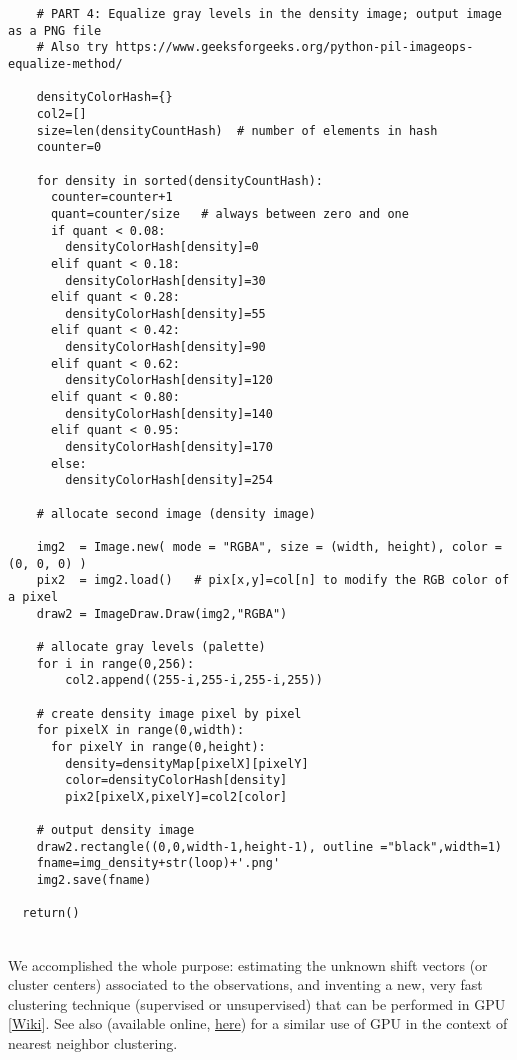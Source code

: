 \documentclass[10pt]{article}
\begin{document}
\begin{lstlisting}
    # PART 4: Equalize gray levels in the density image; output image as a PNG file
    # Also try https://www.geeksforgeeks.org/python-pil-imageops-equalize-method/

    densityColorHash={}
    col2=[]
    size=len(densityCountHash)  # number of elements in hash
    counter=0

    for density in sorted(densityCountHash):
      counter=counter+1
      quant=counter/size   # always between zero and one
      if quant < 0.08:
        densityColorHash[density]=0
      elif quant < 0.18:
        densityColorHash[density]=30
      elif quant < 0.28:
        densityColorHash[density]=55
      elif quant < 0.42:
        densityColorHash[density]=90
      elif quant < 0.62:
        densityColorHash[density]=120
      elif quant < 0.80:
        densityColorHash[density]=140
      elif quant < 0.95:
        densityColorHash[density]=170
      else:
        densityColorHash[density]=254

    # allocate second image (density image)

    img2  = Image.new( mode = "RGBA", size = (width, height), color = (0, 0, 0) )
    pix2  = img2.load()   # pix[x,y]=col[n] to modify the RGB color of a pixel
    draw2 = ImageDraw.Draw(img2,"RGBA")

    # allocate gray levels (palette)
    for i in range(0,256):
        col2.append((255-i,255-i,255-i,255))

    # create density image pixel by pixel
    for pixelX in range(0,width):
      for pixelY in range(0,height):
        density=densityMap[pixelX][pixelY]
        color=densityColorHash[density]
        pix2[pixelX,pixelY]=col2[color]

    # output density image
    draw2.rectangle((0,0,width-1,height-1), outline ="black",width=1)
    fname=img_density+str(loop)+'.png'
    img2.save(fname)

  return()
\end{lstlisting}
\quad \\
 We accomplished the whole purpose: estimating the unknown shift vectors (or cluster centers) associated to the observations, and inventing a new, very fast clustering technique (supervised or unsupervised) that
can be performed in GPU [\href{https://en.wikipedia.org/wiki/General-purpose_computing_on_graphics_processing_units}{Wiki}]. See also \cite{vgar} (available online, \href{https://arxiv.org/abs/0804.1448}{here}) for a similar use of GPU in the context of nearest neighbor clustering.
\end{document}
